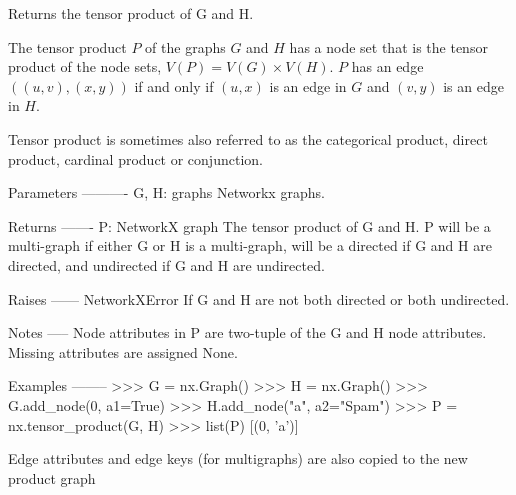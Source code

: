 \begin{DoxyVerb}Returns the tensor product of G and H.

The tensor product $P$ of the graphs $G$ and $H$ has a node set that
is the tensor product of the node sets, $V(P)=V(G) \times V(H)$.
$P$ has an edge $((u,v), (x,y))$ if and only if $(u,x)$ is an edge in $G$
and $(v,y)$ is an edge in $H$.

Tensor product is sometimes also referred to as the categorical product,
direct product, cardinal product or conjunction.


Parameters
----------
G, H: graphs
 Networkx graphs.

Returns
-------
P: NetworkX graph
 The tensor product of G and H. P will be a multi-graph if either G
 or H is a multi-graph, will be a directed if G and H are directed,
 and undirected if G and H are undirected.

Raises
------
NetworkXError
 If G and H are not both directed or both undirected.

Notes
-----
Node attributes in P are two-tuple of the G and H node attributes.
Missing attributes are assigned None.

Examples
--------
>>> G = nx.Graph()
>>> H = nx.Graph()
>>> G.add_node(0, a1=True)
>>> H.add_node("a", a2="Spam")
>>> P = nx.tensor_product(G, H)
>>> list(P)
[(0, 'a')]

Edge attributes and edge keys (for multigraphs) are also copied to the
new product graph
\end{DoxyVerb}
 